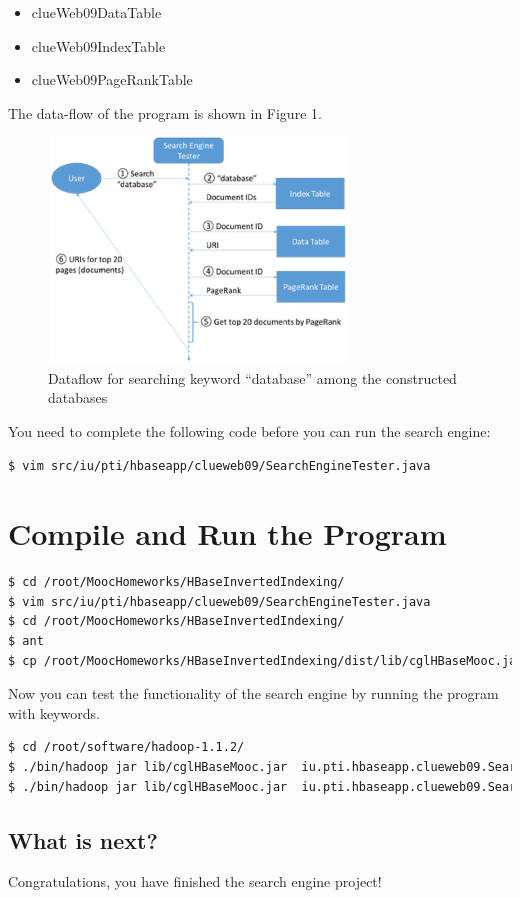 \begin{itemize}
\item clueWeb09DataTable
\item clueWeb09IndexTable
\item clueWeb09PageRankTable
\end{itemize}

The data-flow of the program is shown in Figure 1.

\begin{figure}[!htbp]
\includegraphics[width=8cm,height=6cm]{section/icloud/assignment/problems/project6/p6}
\centering
\caption{Dataflow for searching keyword ``database'' among the constructed databases}
\end{figure}

You need to complete the following code before you can run the search engine:
\begin{lstlisting}[language=bash]
$ vim src/iu/pti/hbaseapp/clueweb09/SearchEngineTester.java
\end{lstlisting}



\section*{Compile and Run the Program}
\begin{lstlisting}[language=bash]
$ cd /root/MoocHomeworks/HBaseInvertedIndexing/
$ vim src/iu/pti/hbaseapp/clueweb09/SearchEngineTester.java
$ cd /root/MoocHomeworks/HBaseInvertedIndexing/
$ ant
$ cp /root/MoocHomeworks/HBaseInvertedIndexing/dist/lib/cglHBaseMooc.jar /root/software/hadoop-1.1.2/lib/
\end{lstlisting}

Now you can test the functionality of the search engine by running the program
with keywords.

\begin{lstlisting}[language=bash]
$ cd /root/software/hadoop-1.1.2/
$ ./bin/hadoop jar lib/cglHBaseMooc.jar  iu.pti.hbaseapp.clueweb09.SearchEngineTester search-keyword snapshot
$ ./bin/hadoop jar lib/cglHBaseMooc.jar  iu.pti.hbaseapp.clueweb09.SearchEngineTester get-page-snapshot 00000113548 |  grep snapshot
\end{lstlisting}

\subsection*{What is next?}
Congratulations, you have finished the search engine project!
